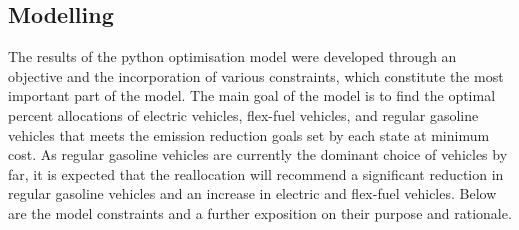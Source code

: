 \documentclass[answers]{exam}
\begin{document}
\subsection{Modelling}
The results of the python optimisation model were developed through an objective and the incorporation of various constraints, which constitute the most important part of the model. The main goal of the model is to find the optimal percent allocations of electric vehicles, flex-fuel vehicles, and regular gasoline vehicles that meets the emission reduction goals set by each state at minimum cost. As regular gasoline vehicles are currently the dominant choice of vehicles by far, it is expected that the reallocation will recommend a significant reduction in regular gasoline vehicles and an increase in electric and flex-fuel vehicles. Below are the model constraints and a further exposition on their purpose and rationale. 
\end{document}
